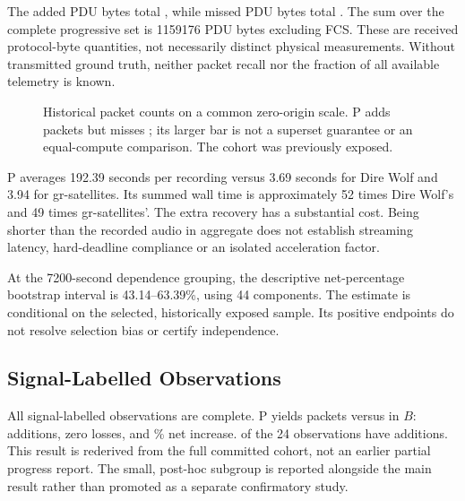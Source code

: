 \documentclass[journal]{IEEEtran}
\begin{document}
The added PDU bytes total \AddedBytes{}, while missed PDU bytes total \LostBytes{}. The sum over the complete progressive set is 1159176 PDU bytes excluding FCS. These are received protocol-byte quantities, not necessarily distinct physical measurements. Without transmitted ground truth, neither packet recall nor the fraction of all available telemetry is known.

\begin{figure}[t]
\centering
{}
\caption{Historical packet counts on a common zero-origin scale. P adds \Added{} packets but misses \Lost{}; its larger bar is not a superset guarantee or an equal-compute comparison. The cohort was previously exposed.}
\label{fig:yield}
\end{figure}

P averages 192.39 seconds per recording versus 3.69 seconds for Dire Wolf and 3.94 for gr-satellites. Its summed wall time is approximately 52 times Dire Wolf's and 49 times gr-satellites'. The extra recovery has a substantial cost. Being shorter than the recorded audio in aggregate does not establish streaming latency, hard-deadline compliance or an isolated acceleration factor.

At the 7200-second dependence grouping, the descriptive net-percentage bootstrap interval is 43.14--63.39\%, using 44 components. The estimate is conditional on the selected, historically exposed sample. Its positive endpoints do not resolve selection bias or certify independence.

\subsection{Signal-Labelled Observations}
All \SignalN{} signal-labelled observations are complete. P yields \SignalOurs{} packets versus \SignalReference{} in $B$: \SignalAdded{} additions, zero losses, and \SignalPercent\% net increase. \SignalGainObservations{} of the 24 observations have additions. This result is rederived from the full committed cohort, not an earlier partial progress report. The small, post-hoc subgroup is reported alongside the main result rather than promoted as a separate confirmatory study.
\end{document}
